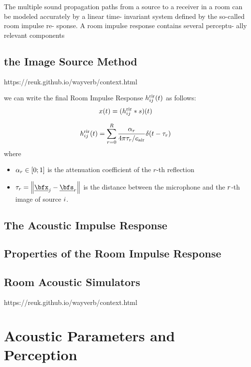 The multiple sound propagation paths from a source to a
receiver in a room can be modeled accurately by a linear time- invariant system defined by the so-called room impulse re- sponse. A room impulse response contains several perceptu- ally relevant components

\subsection{the Image Source Method}
https://reuk.github.io/wayverb/context.html

 we can write the final Room Impulse Response $h^{\text{rir}}_{ij}(t)$ as follows:
\begin{equation}
    x(t) = (h^{\text{rir}}_{ij} \ast s)(t)
\end{equation}

\begin{equation}
    \rir_{ij}(t) = \sum_{r=0}^{R} \frac{\alpha_r}{4 \pi \tau_r / \cair} \delta \kparen{t - \tau_r}
\end{equation}
where
\begin{itemize}
    \item $\alpha_r \in \kintervcc{0}{1}$ is the attenuation coefficient of the $r$-th reflection
    \item $\tau_r = \norm{\positionMicrophone_\idxMic - \positionSource_\idxEch}$ is the distance between the microphone and the $r$-th image of source $i$.
\end{itemize}



\subsection{The Acoustic Impulse Response}

\subsection{Properties of the Room Impulse Response}

\subsection{Room Acoustic Simulators}
https://reuk.github.io/wayverb/context.html

\section{Acoustic Parameters and Perception}
